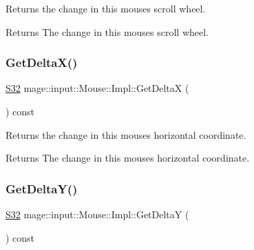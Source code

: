 Returns the change in this mouse\textquotesingle{}s scroll wheel.

\begin{DoxyReturn}{Returns}
The change in this mouse\textquotesingle{}s scroll wheel. 
\end{DoxyReturn}
\mbox{\label{classmage_1_1input_1_1_mouse_1_1_impl_a61e7ce497a1779fcd58bce1bf067abfe}} 
\subsubsection{\texorpdfstring{Get\+Delta\+X()}{GetDeltaX()}}
{\footnotesize\ttfamily \mbox{\hyperlink{namespacemage_a642e05c5c83642b6946703615cdbf2da}{S32}} mage\+::input\+::\+Mouse\+::\+Impl\+::\+Get\+DeltaX (\begin{DoxyParamCaption}{ }\end{DoxyParamCaption}) const\hspace{0.3cm}{\ttfamily [noexcept]}}

Returns the change in this mouse\textquotesingle{}s horizontal coordinate.

\begin{DoxyReturn}{Returns}
The change in this mouse\textquotesingle{}s horizontal coordinate. 
\end{DoxyReturn}
\mbox{\label{classmage_1_1input_1_1_mouse_1_1_impl_accce0b038c380bf32625de965a83e1db}} 
\subsubsection{\texorpdfstring{Get\+Delta\+Y()}{GetDeltaY()}}
{\footnotesize\ttfamily \mbox{\hyperlink{namespacemage_a642e05c5c83642b6946703615cdbf2da}{S32}} mage\+::input\+::\+Mouse\+::\+Impl\+::\+Get\+DeltaY (\begin{DoxyParamCaption}{ }\end{DoxyParamCaption}) const\hspace{0.3cm}{\ttfamily [noexcept]}}

